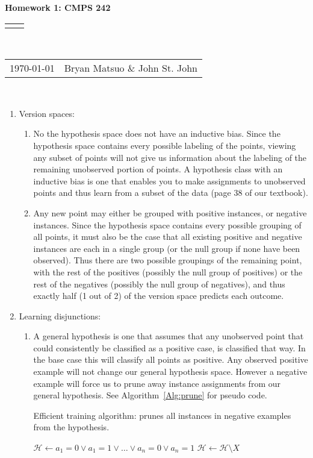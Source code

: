 \documentclass[12pt]{article}
\renewcommand{\title}[1]{\textbf{#1}\\}
\renewcommand{\line}{\begin{tabularx}{\textwidth}{X>{\raggedleft}X}\hline\\\end{tabularx}\\[-0.5cm]}
\newcommand{\leftright}[2]{\begin{tabularx}{\textwidth}{X>{\raggedleft}X}#1%
& #2\\\end{tabularx}\\[-0.5cm]}
\begin{document}
\title{Homework 1: CMPS 242}
\line
\leftright{\today}{Bryan Matsuo \& John St. John} %
\begin{enumerate}
\item Version spaces:

\begin{enumerate}
\item No the hypothesis space does not have an inductive bias. Since the
hypothesis space contains every possible labeling of the points, viewing
any subset of points will not give us information about the labeling
of the remaining unobserved portion of points. A hypothesis class
with an inductive bias is one that enables you to make assignments
to unobserved points and thus learn from a subset of the data (page
38 of our textbook).
\item Any new point may either be grouped with positive instances, or negative
instances. Since the hypothesis space contains every possible grouping
of all points, it must also be the case that all existing positive
and negative instances are each in a single group (or the null group
if none have been observed). Thus there are two possible groupings
of the remaining point, with the rest of the positives (possibly the
null group of positives) or the rest of the negatives (possibly the
null group of negatives), and thus exactly half (1 out of 2) of the
version space predicts each outcome.
\end{enumerate}
\item Learning disjunctions:

\begin{enumerate}
\item A general hypothesis is one that assumes that any unobserved point
that could consistently be classified as a positive case, is classified
that way. In the base case this will classify all points as positive.
Any observed positive example will not change our general hypothesis
space. However a negative example will force us to prune away instance
assignments from our general hypothesis. See Algorithm~\ref{Alg:prune} for pseudo code.
\begin{algorithm}
\caption{Efficient training algorithm: prunes all instances in negative examples from the hypothesis. }
\label{Alg:prune}
\begin{algorithmic}
\STATE $\mathcal{H} \gets a_1=0 \vee a_1=1 \vee \ldots \vee a_n=0 \vee a_n=1$
		\STATE $\mathcal{H} \gets \mathcal{H} \setminus X$
	\ENDIF
\ENDFOR
\end{algorithmic}
\end{algorithm}


\end{enumerate}
\end{enumerate}
\end{document}
